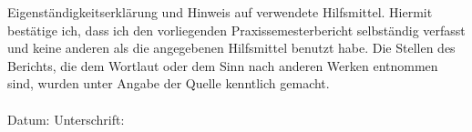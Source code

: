 \label{erklaerung}

Eigenständigkeitserklärung und Hinweis auf verwendete
Hilfsmittel.
Hiermit bestätige ich, dass ich den vorliegenden Praxissemesterbericht selbständig
verfasst und keine anderen als die angegebenen Hilfsmittel benutzt habe. Die Stellen
des Berichts, die dem Wortlaut oder dem Sinn nach anderen Werken entnommen sind,
wurden unter Angabe der Quelle kenntlich gemacht.\\
\\[1.5cm]
Datum:	\hrulefill\enspace Unterschrift: \hrulefill
\\[3.5cm]


